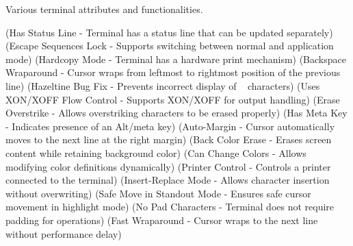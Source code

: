 
\begin{NxSBox}
	\begin{NxIDBox}
		Various terminal attributes and functionalities.
		\begin{NxListDark}
			 (Has Status Line - Terminal has a status line that can be updated separately)
			 (Escape Sequences Lock - Supports switching between normal and application mode)
			 (Hardcopy Mode - Terminal has a hardware print mechanism)
			 (Backspace Wraparound - Cursor wraps from leftmost to rightmost position of the previous line)
			 (Hazeltine Bug Fix - Prevents incorrect display of ~ characters)
			 (Uses XON/XOFF Flow Control - Supports XON/XOFF for output handling)
			 (Erase Overstrike - Allows overstriking characters to be erased properly)
			 (Has Meta Key - Indicates presence of an Alt/meta key)
			 (Auto-Margin - Cursor automatically moves to the next line at the right margin)
			 (Back Color Erase - Erases screen content while retaining background color)
			 (Can Change Colors - Allows modifying color definitions dynamically)
			 (Printer Control - Controls a printer connected to the terminal)
			 (Insert-Replace Mode - Allows character insertion without overwriting)
			 (Safe Move in Standout Mode - Ensures safe cursor movement in highlight mode)
			 (No Pad Characters - Terminal does not require padding for operations)
			 (Fast Wraparound - Cursor wraps to the next line without performance delay)
		\end{NxListDark}
	\end{NxIDBox}
\end{NxSBox}


